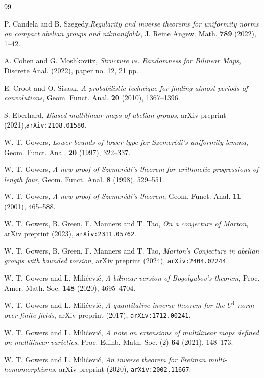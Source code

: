 \documentclass[a4paper,11pt]{article}
\numberwithin{theorem}{section}
\theoremstyle{definition}
\renewenvironment{thebibliography}[1]
{
  \begin{oldthebibliography}{#1}
    \setlength{\itemsep}{0em  plus 0.3ex}
    \setlength{\parskip}{0em}
}
{
  \end{oldthebibliography}
}
\begin{document}
\begin{thebibliography}{99}
P. Candela and B. Szegedy,\emph{Regularity and inverse theorems for uniformity norms on compact abelian groups and nilmanifolds}, J. Reine Angew. Math. \textbf{789} (2022), 1--42.  

 A. Cohen and G. Moshkovitz, \textit{Structure vs. Randomness for Bilinear Maps}, Discrete Anal. (2022), paper no. 12, 21 pp.

 E. Croot and O. Sisask, \textit{A probabilistic technique for finding almost-periods of convolutions}, Geom. Funct. Anal. \textbf{20} (2010), 1367--1396. 

 S. Eberhard, \textit{Biased multilinear maps of abelian groups}, arXiv preprint (2021),\verb+arXiv:2108.01580+.

 W. T. Gowers, \emph{Lower bounds of tower type for Szemer\'edi's uniformity lemma}, Geom. Funct. Anal. \textbf{20} (1997), 322--337.

 W. T. Gowers, \textit{A new proof of Szemer\'edi's theorem for arithmetic progressions of length four}, Geom. Funct. Anal. \textbf{8} (1998), 529--551.

 W. T. Gowers, \emph{A new proof of Szemer\'edi's theorem}, Geom. Funct. Anal. \textbf{11} (2001), 465--588.

 W. T. Gowers, B. Green, F. Manners and T. Tao, \textit{On a conjecture of Marton}, arXiv preprint (2023), \verb+arXiv:2311.05762+.

 W. T. Gowers, B. Green, F. Manners and T. Tao, \textit{Marton's Conjecture in abelian groups with bounded torsion}, arXiv preprint (2024), \verb+arXiv:2404.02244+.

 W. T. Gowers and L. Mili\'cevi\'c, \emph{A bilinear version of Bogolyubov's theorem}, Proc. Amer. Math. Soc. \textbf{148} (2020), 4695--4704.

 W. T. Gowers and L. Mili\'cevi\'c, \emph{A quantitative inverse theorem for the $U^4$ norm over finite fields}, arXiv preprint (2017), \verb+arXiv:1712.00241+.

 W. T. Gowers and L. Mili\'cevi\'c, \textit{A note on extensions of multilinear maps defined on multilinear varieties},  Proc. Edinb. Math. Soc. (2) \textbf{64} (2021), 148--173.

 W. T. Gowers and L. Milićević, \emph{An inverse theorem for Freiman multi-homomorphisms}, arXiv preprint (2020), \verb+arXiv:2002.11667+.


\end{thebibliography}
\end{document}
